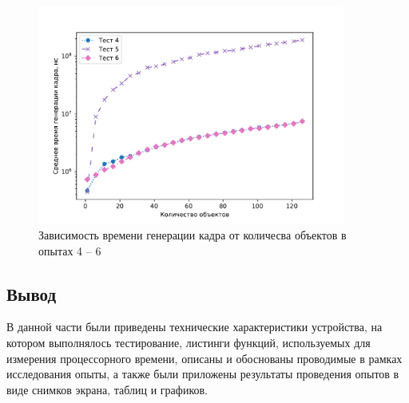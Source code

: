 \begin{figure}[H]
	\centering
    \includegraphics[width=0.9\textwidth]{img/456/plot_time.pdf}
	\caption{Зависимость времени генерации кадра от количесва объектов в опытах 4 -- 6}
	\label{fig:456:time}
\end{figure}



\subsection*{Вывод}

В данной части были приведены технические характеристики устройства, на котором выполнялось тестирование, листинги функций, используемых для измерения процессорного времени, описаны и обоснованы проводимые в рамках исследования опыты, а также были приложены результаты проведения опытов в виде снимков экрана, таблиц и графиков.

